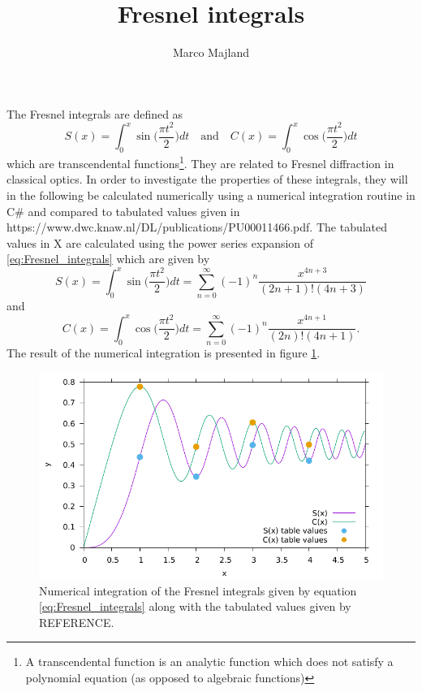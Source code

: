 \documentclass{article}
\title{Fresnel integrals}
\author{Marco Majland}
\begin{document}
	\maketitle
	\noindent
	The Fresnel integrals are defined as
	\begin{equation}
		S(x) = \int_{0}^{x}\sin\Big(\frac{\pi t^2}{2}\Big)dt\quad\textrm{and}\quad C(x) = \int_{0}^{x}\cos\Big(\frac{\pi t^2}{2}\Big)dt
		\label{eq:Fresnel_integrals}
	\end{equation}
	which are transcendental functions\footnote{A transcendental function is an analytic function which does not satisfy a polynomial equation (as opposed to algebraic functions)}. They are related to Fresnel diffraction in classical optics. In order to investigate the properties of these integrals, they will in the following be calculated numerically using a numerical integration routine in C\# and compared to tabulated values given in https://www.dwc.knaw.nl/DL/publications/PU00011466.pdf. The tabulated values in X are calculated using the power series expansion of \ref{eq:Fresnel_integrals} which are given by
	\begin{equation}
		S(x) = \int_{0}^{x}\sin\Big(\frac{\pi t^2}{2}\Big)dt = \sum_{n = 0}^{\infty}(-1)^{n}\frac{x^{4n+3}}{(2n+1)!(4n+3)}
	\end{equation}
	and
	\begin{equation}
	C(x) = \int_{0}^{x}\cos\Big(\frac{\pi t^2}{2}\Big)dt = \sum_{n = 0}^{\infty}(-1)^{n}\frac{x^{4n+1}}{(2n)!(4n+1)}.
	\end{equation}
	The result of the numerical integration is presented in figure \ref{fig:integration}.
	\begin{figure}
	\includegraphics[]{Output.pdf}
	\caption{Numerical integration of the Fresnel integrals given by equation \ref{eq:Fresnel_integrals} along with the tabulated values given by REFERENCE.}
	\label{fig:integration}
	\end{figure}
\end{document}
